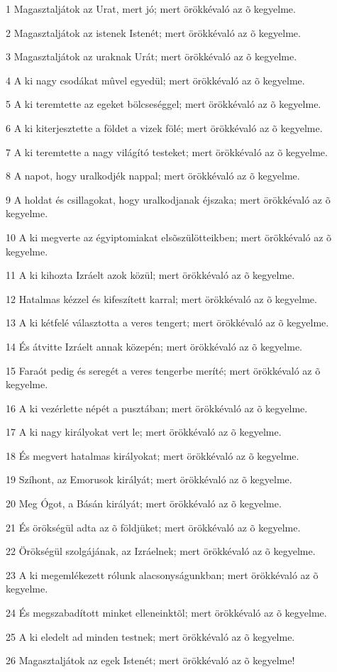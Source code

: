 \par 1 Magasztaljátok az Urat, mert jó; mert örökkévaló az õ kegyelme.
\par 2 Magasztaljátok az istenek Istenét; mert örökkévaló az õ kegyelme.
\par 3 Magasztaljátok az uraknak Urát; mert örökkévaló az õ kegyelme.
\par 4 A ki nagy csodákat mûvel egyedül; mert örökkévaló az õ kegyelme.
\par 5 A ki teremtette az egeket bölcseséggel; mert örökkévaló az õ kegyelme.
\par 6 A ki kiterjesztette a földet a vizek fölé; mert örökkévaló az õ kegyelme.
\par 7 A ki teremtette a nagy világító testeket; mert örökkévaló az õ kegyelme.
\par 8 A napot, hogy uralkodjék nappal; mert örökkévaló az õ kegyelme.
\par 9 A holdat és csillagokat, hogy uralkodjanak éjszaka; mert örökkévaló az õ kegyelme.
\par 10 A ki megverte az égyiptomiakat elsõszülötteikben; mert örökkévaló az õ kegyelme.
\par 11 A ki kihozta Izráelt azok közül; mert örökkévaló az õ kegyelme.
\par 12 Hatalmas kézzel és kifeszített karral; mert örökkévaló az õ kegyelme.
\par 13 A ki kétfelé választotta a veres tengert; mert örökkévaló az õ kegyelme.
\par 14 És átvitte Izráelt annak közepén; mert örökkévaló az õ kegyelme.
\par 15 Faraót pedig és seregét a veres tengerbe meríté; mert örökkévaló az õ kegyelme.
\par 16 A ki vezérlette népét a pusztában; mert örökkévaló az õ kegyelme.
\par 17 A ki nagy királyokat vert le; mert örökkévaló az õ kegyelme.
\par 18 És megvert hatalmas királyokat; mert örökkévaló az õ kegyelme.
\par 19 Szíhont, az Emorusok királyát; mert örökkévaló az õ kegyelme.
\par 20 Meg Ógot, a Básán királyát; mert örökkévaló az õ kegyelme.
\par 21 És örökségül adta az õ földjüket; mert örökkévaló az õ kegyelme.
\par 22 Örökségül szolgájának, az Izráelnek; mert örökkévaló az õ kegyelme.
\par 23 A ki megemlékezett rólunk alacsonyságunkban; mert örökkévaló az õ kegyelme.
\par 24 És megszabadított minket elleneinktõl; mert örökkévaló az õ kegyelme.
\par 25 A ki eledelt ad minden testnek; mert örökkévaló az õ kegyelme.
\par 26 Magasztaljátok az egek Istenét; mert örökkévaló az õ kegyelme!

